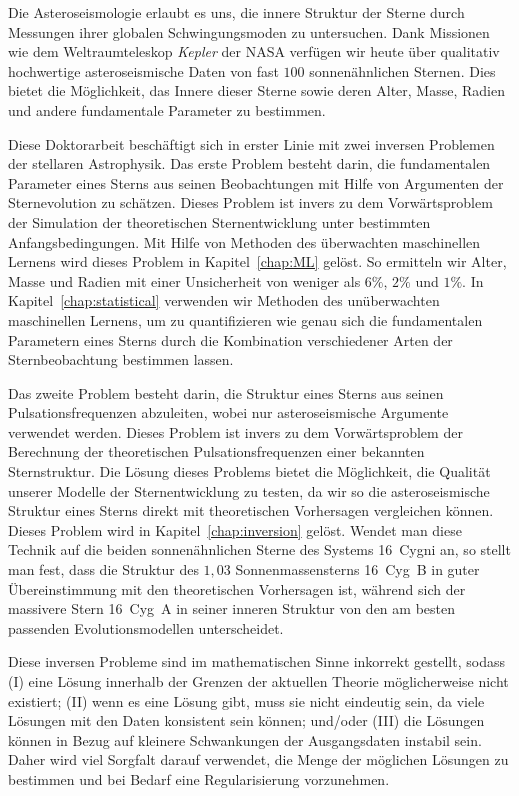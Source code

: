 Die Asteroseismologie erlaubt es uns, die innere Struktur der Sterne durch Messungen ihrer globalen Schwingungsmoden zu untersuchen. 
Dank Missionen wie dem Weltraumteleskop \emph{Kepler} der NASA verf\"ugen wir heute \"uber qualitativ hochwertige asteroseismische Daten von fast $100$ sonnen\"ahnlichen Sternen. 
Dies bietet die M\"oglichkeit, das Innere dieser Sterne sowie deren Alter, Masse, Radien und andere fundamentale Parameter zu bestimmen. 

Diese Doktorarbeit besch\"aftigt sich in erster Linie mit zwei inversen Problemen der stellaren Astrophysik. 
Das erste Problem besteht darin, die fundamentalen Parameter eines Sterns aus seinen Beobachtungen mit Hilfe von Argumenten der Sternevolution zu sch\"atzen. 
Dieses Problem ist invers zu dem Vorw\"artsproblem der Simulation der theoretischen Sternentwicklung unter bestimmten Anfangsbedingungen. 
Mit Hilfe von Methoden des \"uberwachten maschinellen Lernens wird dieses Problem in Kapitel~\ref{chap:ML} gel\"ost. 
So ermitteln wir Alter, Masse und Radien mit einer Unsicherheit von weniger als $6\%$, $2\%$ und $1\%$. 
In Kapitel~\ref{chap:statistical} verwenden wir Methoden des un\"uberwachten maschinellen Lernens, um zu quantifizieren wie genau sich die fundamentalen Parametern eines Sterns durch die Kombination verschiedener Arten der Sternbeobachtung bestimmen lassen.

Das zweite Problem besteht darin, die Struktur eines Sterns aus seinen Pulsationsfrequenzen abzuleiten, wobei nur asteroseismische Argumente verwendet werden. 
Dieses Problem ist invers zu dem Vorw\"artsproblem der Berechnung der theoretischen Pulsationsfrequenzen einer bekannten Sternstruktur. 
Die L\"osung dieses Problems bietet die M\"oglichkeit, die Qualit\"at unserer Modelle der Sternentwicklung zu testen, da wir so die asteroseismische Struktur eines Sterns direkt mit theoretischen Vorhersagen vergleichen k\"onnen. 
Dieses Problem wird in Kapitel~\ref{chap:inversion} gel\"ost. 
Wendet man diese Technik auf die beiden sonnen\"ahnlichen Sterne des Systems 16~Cygni an, so stellt man fest, dass die Struktur des $1,03$ Sonnenmassensterns 16~Cyg~B in guter \"Ubereinstimmung mit den theoretischen Vorhersagen ist, w\"ahrend sich der massivere Stern 16~Cyg~A in seiner inneren Struktur von den am besten passenden Evolutionsmodellen unterscheidet. 

Diese inversen Probleme sind im mathematischen Sinne inkorrekt gestellt, sodass (I) eine L\"osung innerhalb der Grenzen der aktuellen Theorie m\"oglicherweise nicht existiert; (II) wenn es eine L\"osung gibt, muss sie nicht eindeutig sein, da viele L\"osungen mit den Daten konsistent sein k\"onnen; und/oder (III) die L\"osungen k\"onnen in Bezug auf kleinere Schwankungen der Ausgangsdaten instabil sein. 
Daher wird viel Sorgfalt darauf verwendet, die Menge der m\"oglichen L\"osungen zu bestimmen und bei Bedarf eine Regularisierung vorzunehmen. 

